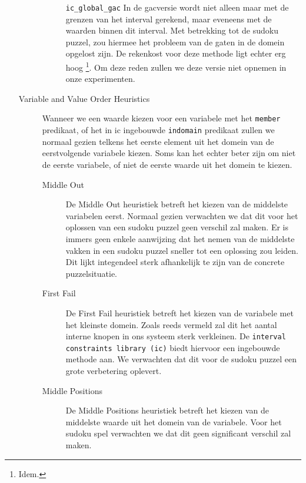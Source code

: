 \begin{enumerate}
\begin{description}
\begin{description}
                        \verb|ic_global_gac| In de gacversie wordt niet alleen maar met de grenzen van het interval gerekend,
                        maar eveneens met de waarden binnen dit interval. Met betrekking tot de sudoku puzzel, zou hiermee
                        het probleem van de gaten in de domein opgelost zijn. De rekenkost voor deze methode ligt echter erg
                        hoog \footnote{Idem.}. Om deze reden zullen we deze versie niet opnemen in onze experimenten.
                \end{description}
        \item[Variable and Value Order Heuristics]
                Wanneer we een waarde kiezen voor een variabele met het \verb|member| predikaat, of het in ic ingebouwde \verb|indomain|
                predikaat zullen we normaal gezien telkens het eerste element uit het domein van de eerstvolgende variabele kiezen. Soms kan het
                echter beter zijn om niet de eerste variabele, of niet de eerste waarde uit het domein te kiezen.
                \begin{description}
                \item[Middle Out] 
                        De Middle Out heuristiek betreft het kiezen van de middelste variabelen eerst. Normaal gezien verwachten 
                        we dat dit voor het oplossen van een sudoku puzzel geen verschil zal maken. Er is immers geen enkele
                        aanwijzing dat het nemen van de middelste vakken in een sudoku puzzel sneller tot een oplossing zou
                        leiden. Dit lijkt integendeel sterk afhankelijk te zijn van de concrete puzzelsituatie.
                \item[First Fail] 
                        De First Fail heuristiek betreft het kiezen van de variabele met het kleinste domein. Zoals reeds vermeld
                        zal dit het aantal interne knopen in ons systeem sterk verkleinen. De \verb|interval constraints library (ic)|
                        biedt hiervoor een ingebouwde methode aan. We verwachten dat dit voor de sudoku puzzel een grote verbetering
                        oplevert.
                \item[Middle Positions]
                        De Middle Positions heuristiek betreft het kiezen van de middelste waarde uit het domein van de variabele.
                        Voor het sudoku spel verwachten we dat dit geen significant verschil zal maken.                 
                \end{description}

\end{description}
\end{enumerate}
